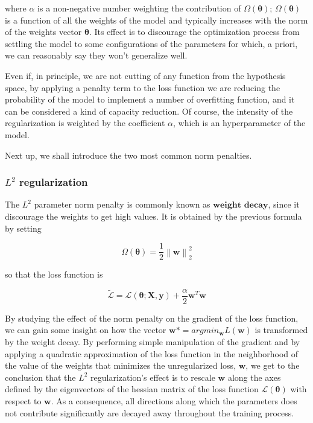 \documentclass[a4paper, twoside]{article}
\begin{document}
    where $\alpha$ is a non-negative number weighting the contribution of $\Omega(\boldsymbol{\theta})$; $\Omega(\boldsymbol{\theta})$ is a function of all the weights of the model and typically increases with the norm of the weights vector $\boldsymbol{\theta}$. Its effect is to discourage the optimization process from settling the model to some configurations of the parameters for which, a priori, we can reasonably say they won't generalize well.

    Even if, in principle, we are not cutting of any function from the hypothesis space, by applying a penalty term to the loss function we are reducing the probability of the model to implement a number of overfitting function, and it can be considered a kind of capacity reduction. Of course, the intensity of the regularization is weighted by the coefficient $\alpha$, which is an hyperparameter of the model.

   Next up, we shall introduce the two most common norm penalties.

   \subsubsection{$L^2$ regularization}

   The $L^2$ parameter norm penalty is commonly known as $\textbf{weight decay}$, since it discourage the weights to get high values. It is obtained by the previous formula by setting

   $$\Omega(\boldsymbol{\theta}) = \frac{1}{2} \left\|\boldsymbol{w}\right\|_2^2$$

   so that the loss function is

   $$\widetilde{\mathcal{L}} = \mathcal{L}(\boldsymbol{\theta}; \boldsymbol{X}, \boldsymbol{y}) + \frac{\alpha}{2} \boldsymbol{w}^T \boldsymbol{w} $$

   By studying the effect of the norm penalty on the gradient of the loss function, we can gain some insight on how the vector $\boldsymbol{w}* = arg min_{\boldsymbol{w}} L(\boldsymbol{w})$ is transformed by the weight decay. By performing simple manipulation of the gradient and by applying a quadratic approximation of the loss function in the neighborhood of the value of the weights that minimizes the unregularized loss, $\boldsymbol{w}$, we get to the conclusion that the $L^2$ regularization's effect is to rescale $\boldsymbol{w}$ along the axes defined by the eigenvectors of the hessian matrix of the loss function $\mathcal{L}(\boldsymbol{\theta})$ with respect to $\boldsymbol{w}$. As a consequence, all directions along which the parameters does not contribute significantly are decayed away throughout the training process.
\end{document}

